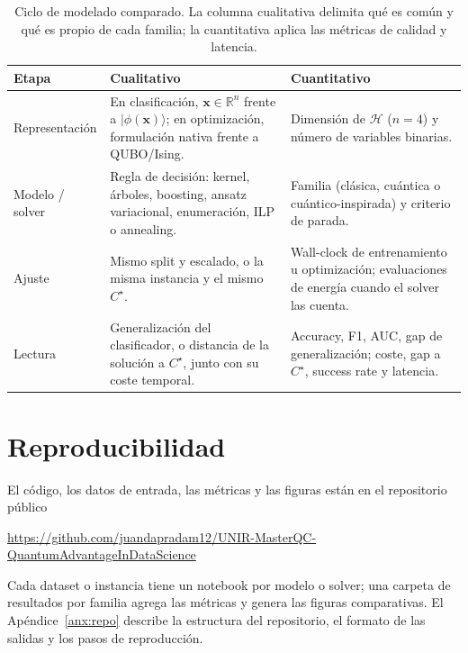 \begin{table}[!htbp]
\centering
\small
\begin{tabularx}{\linewidth}{@{}>{\raggedright\arraybackslash}p{2.45cm} >{\raggedright\arraybackslash}X >{\raggedright\arraybackslash}X@{}}
\toprule
\textbf{Etapa} & \textbf{Cualitativo} & \textbf{Cuantitativo} \\
\midrule
Representación & En clasificación, $\mathbf{x}\in\mathbb{R}^{n}$ frente a $\lvert\phi(\mathbf{x})\rangle$; en optimización, formulación nativa frente a QUBO/Ising. & Dimensión de $\mathcal{H}$ ($n=4$) y número de variables binarias. \\
Modelo / solver & Regla de decisión: kernel, árboles, boosting, ansatz variacional, enumeración, ILP o annealing. & Familia (clásica, cuántica o cuántico-inspirada) y criterio de parada. \\
Ajuste & Mismo split y escalado, o la misma instancia y el mismo $C^\star$. & Wall-clock de entrenamiento u optimización; evaluaciones de energía cuando el solver las cuenta. \\
Lectura & Generalización del clasificador, o distancia de la solución a $C^\star$, junto con su coste temporal. & Accuracy, F1, AUC, gap de generalización; coste, gap a $C^\star$, success rate y latencia. \\
\bottomrule
\end{tabularx}
\caption{Ciclo de modelado comparado. La columna cualitativa delimita qué es común y qué es propio de cada familia; la cuantitativa aplica las métricas de calidad y latencia.}
\label{tab:ciclo}
\end{table}

\section{Reproducibilidad}

El código, los datos de entrada, las métricas y las figuras están en el repositorio público

\begin{center}
\url{https://github.com/juandapradam12/UNIR-MasterQC-QuantumAdvantageInDataScience}
\end{center}

\noindent Cada dataset o instancia tiene un notebook por modelo o solver; una carpeta de resultados por familia agrega las métricas y genera las figuras comparativas. El Apéndice~\ref{anx:repo} describe la estructura del repositorio, el formato de las salidas y los pasos de reproducción.

